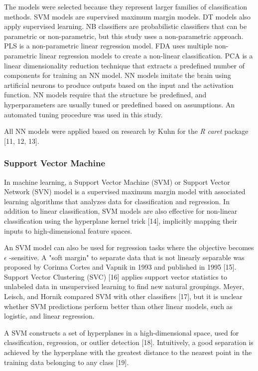 \documentclass[sn-mathphys-num]{sn-jnl}%
\begin{document}
The models were selected because they represent larger families of classification methods. SVM models are supervised maximum margin models. DT models also apply supervised learning. NB classifiers are probabilistic classifiers that can be parametric or non-parametric, but this study uses a non-parametric approach. PLS is a non-parametric linear regression model. FDA uses multiple non-parametric linear regression models to create a non-linear classification. PCA is a linear dimensionality reduction technique that extracts a predefined number of components for training an NN model. NN models imitate the brain using artificial neurons to produce outputs based on the input and the activation function. NN models require that the structure be predefined, and hyperparameters are usually tuned or predefined based on assumptions. An automated tuning procedure was used in this study.

All NN models were applied based on research by Kuhn for the \textit{R} \textit{caret} package [11, 12, 13].

\subsubsection{Support Vector Machine}

In machine learning, a Support Vector Machine (SVM) or Support Vector Network (SVN) model is a supervised maximum margin model with associated learning algorithms that analyzes data for classification and regression. In addition to linear classification, SVM models are also effective for non-linear classification using the hyperplane kernel trick [14], implicitly mapping their inputs to high-dimensional feature spaces.

An SVM model can also be used for regression tasks where the objective becomes $\epsilon$ -sensitive. A "soft margin" to separate data that is not linearly separable was proposed by Corinna Cortes and Vapnik in 1993 and published in 1995 [15]. Support Vector Clustering (SVC) [16] applies support vector statistics to unlabeled data in unsupervised learning to find new natural groupings. Meyer, Leisch, and Hornik compared SVM with other classifiers [17], but it is unclear whether SVM predictions perform better than other linear models, such as logistic, and linear regression.

A SVM constructs a set of hyperplanes in a high-dimensional space, used for classification, regression, or outlier detection [18]. Intuitively, a good separation is achieved by the hyperplane with the greatest distance to the nearest point in the training data belonging to any class [19].
\end{document}
